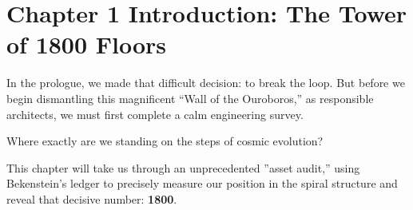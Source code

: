 \section*{Chapter 1 Introduction: The Tower of 1800 Floors}

In the prologue, we made that difficult decision: to break the loop. But before we begin dismantling this magnificent ``Wall of the Ouroboros,'' as responsible architects, we must first complete a calm engineering survey.

Where exactly are we standing on the steps of cosmic evolution?

This chapter will take us through an unprecedented ''asset audit,'' using Bekenstein's ledger to precisely measure our position in the spiral structure and reveal that decisive number: \textbf{1800}.

